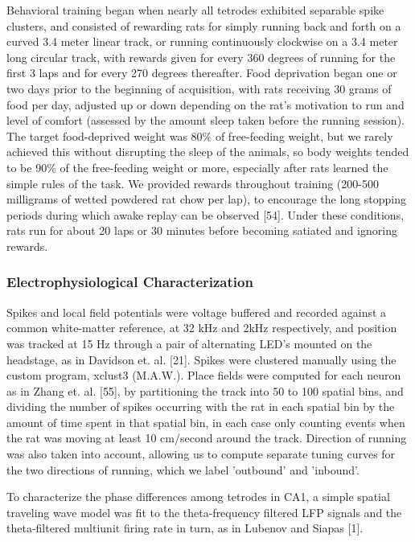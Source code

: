 \documentclass[]{article}
\begin{document}
Behavioral training began when nearly all tetrodes exhibited separable
spike clusters, and consisted of rewarding rats for simply running back
and forth on a curved 3.4 meter linear track, or running continuously
clockwise on a 3.4 meter long circular track, with rewards given for
every 360 degrees of running for the first 3 laps and for every 270
degrees thereafter. Food deprivation began one or two days prior to the
beginning of acquisition, with rats receiving 30 grams of food per day,
adjusted up or down depending on the rat's motivation to run and level
of comfort (assessed by the amount sleep taken before the running
session). The target food-deprived weight was 80\% of free-feeding
weight, but we rarely achieved this without disrupting the sleep of the
animals, so body weights tended to be 90\% of the free-feeding weight or
more, especially after rats learned the simple rules of the task. We
provided rewards throughout training (200-500 milligrams of wetted
powdered rat chow per lap), to encourage the long stopping periods
during which awake replay can be observed {[}54{]}. Under these
conditions, rats run for about 20 laps or 30 minutes before becoming
satiated and ignoring rewards.

\subsubsection{Electrophysiological Characterization}

Spikes and local field potentials were voltage buffered and recorded
against a common white-matter reference, at 32 kHz and 2kHz
respectively, and position was tracked at 15 Hz through a pair of
alternating LED's mounted on the headstage, as in Davidson et. al.
{[}21{]}. Spikes were clustered manually using the custom program,
xclust3 (M.A.W.). Place fields were computed for each neuron as in Zhang
et. al. {[}55{]}, by partitioning the track into 50 to 100 spatial bins,
and dividing the number of spikes occurring with the rat in each spatial
bin by the amount of time spent in that spatial bin, in each case only
counting events when the rat was moving at least 10 cm/second around the
track. Direction of running was also taken into account, allowing us to
compute separate tuning curves for the two directions of running, which
we label 'outbound' and 'inbound'.

To characterize the phase differences among tetrodes in CA1, a simple
spatial traveling wave model was fit to the theta-frequency filtered LFP
signals and the theta-filtered multiunit firing rate in turn, as in
Lubenov and Siapas {[}1{]}.
\end{document}
